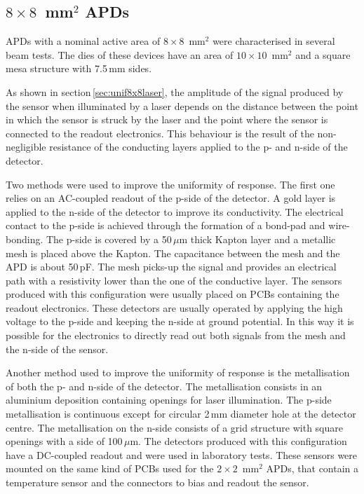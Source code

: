 \documentclass[review,number,sort&compress]{elsarticle}
\begin{document}
\subsection{$8 \times 8$~mm$^2$ APDs}

APDs with a nominal active area of $8 \times 8$~mm$^2$ were characterised in several beam tests.
The dies of these devices have an area of $10 \times 10$~mm$^2$ and a square mesa structure with 7.5\,mm sides.

As shown in section\,\ref{sec:unif8x8laser}, the amplitude of the signal produced by the sensor when illuminated by a laser depends on the distance between the point in which the sensor is struck by the laser and the point where the sensor is connected to the readout electronics.
This behaviour is the result of the non-negligible resistance of the conducting layers applied to the p- and n-side of the detector.

Two methods were used to improve the uniformity of response.
The first one relies on an AC-coupled readout of the p-side of the detector.
A gold layer is applied to the n-side of the detector to improve its conductivity.
The electrical contact to the p-side is achieved through the formation of a bond-pad and wire-bonding.
The p-side is covered by a 50\,$\mu$m thick Kapton layer and a metallic mesh is placed above the Kapton.
The capacitance between the mesh and the APD is about 50\,pF.
The mesh picks-up the signal and provides an electrical path with a resistivity lower than the one of the conductive layer.
The sensors produced with this configuration were usually placed on PCBs containing the readout electronics.
These detectors are usually operated by applying the high voltage to the p-side and keeping the n-side at ground potential.
In this way it is possible for the electronics to directly read out both signals from the mesh and the n-side of the sensor.

Another method used to improve the uniformity of response is the metallisation of both the p- and n-side of the detector.
The metallisation consists in an aluminium deposition containing openings for laser illumination.
The p-side metallisation is continuous except for circular 2\,mm diameter hole at the detector centre.
The metallisation on the n-side consists of a grid structure with square openings with a side of 100\,$\mu$m.
The detectors produced with this configuration have a DC-coupled readout and were used in laboratory tests.
These sensors were mounted on the same kind of PCBs used for the $2 \times 2$~mm$^2$ APDs, that contain a temperature sensor and the connectors to bias and readout the sensor.
\end{document}
